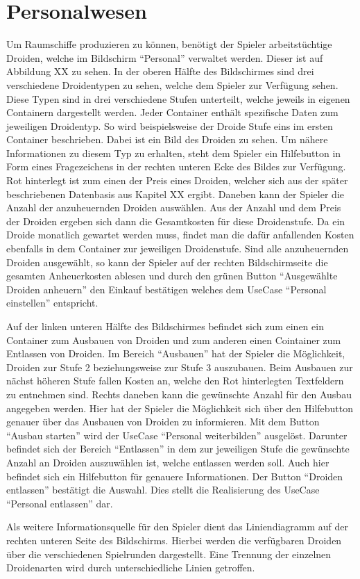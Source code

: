 \section{Personalwesen}
\label{sec:ui-personalwesen}

Um Raumschiffe produzieren zu können, benötigt der Spieler arbeitstüchtige Droiden, welche im Bildschirm “Personal” verwaltet werden. Dieser ist auf Abbildung XX zu sehen.
In der oberen Hälfte des Bildschirmes sind drei verschiedene Droidentypen zu sehen, welche dem Spieler zur Verfügung sehen. Diese Typen sind in drei verschiedene Stufen unterteilt, welche jeweils in eigenen Containern dargestellt werden. Jeder Container enthält spezifische Daten zum jeweiligen Droidentyp. So wird beispielsweise der Droide Stufe eins im ersten Container beschrieben. Dabei ist ein Bild des Droiden zu sehen. Um nähere Informationen zu diesem Typ zu erhalten, steht dem Spieler ein Hilfebutton in Form eines Fragezeichens in der rechten unteren Ecke des Bildes zur Verfügung. Rot hinterlegt ist zum einen der Preis eines Droiden, welcher sich aus der später beschriebenen Datenbasis aus Kapitel XX ergibt. Daneben kann der Spieler die Anzahl der anzuheuernden Droiden auswählen. Aus der Anzahl und dem Preis der Droiden ergeben sich dann die Gesamtkosten für diese Droidenstufe. Da ein Droide monatlich gewartet werden muss, findet man die dafür anfallenden Kosten ebenfalls in dem Container zur jeweiligen Droidenstufe. Sind alle anzuheuernden Droiden ausgewählt, so kann der Spieler auf der rechten Bildschirmseite die gesamten Anheuerkosten ablesen und durch den grünen Button “Ausgewählte Droiden anheuern” den Einkauf bestätigen welches dem UseCase “Personal einstellen” entspricht.

Auf der linken unteren Hälfte des Bildschirmes befindet sich zum einen ein Container zum Ausbauen von Droiden und zum anderen einen Cointainer zum Entlassen von Droiden. Im Bereich “Ausbauen” hat der Spieler die Möglichkeit, Droiden zur Stufe 2 beziehungsweise zur Stufe 3 auszubauen. Beim Ausbauen zur nächst höheren Stufe fallen Kosten an, welche den Rot hinterlegten Textfeldern zu entnehmen sind. Rechts daneben kann die gewünschte Anzahl für den Ausbau angegeben werden. Hier hat der Spieler die Möglichkeit sich über den Hilfebutton genauer über das Ausbauen von Droiden zu informieren. Mit dem Button “Ausbau starten” wird der UseCase “Personal weiterbilden” ausgelöst. Darunter befindet sich der Bereich “Entlassen” in dem zur jeweiligen Stufe die gewünschte Anzahl an Droiden auszuwählen ist, welche entlassen werden soll. Auch hier befindet sich ein Hilfebutton für genauere Informationen. Der Button “Droiden entlassen” bestätigt die Auswahl. Dies stellt die Realisierung des UseCase “Personal entlassen” dar. 

Als weitere Informationsquelle für den Spieler dient das Liniendiagramm auf der rechten unteren Seite des Bildschirms. Hierbei werden die verfügbaren Droiden über die verschiedenen Spielrunden dargestellt. Eine Trennung der einzelnen Droidenarten wird durch unterschiedliche Linien getroffen. 